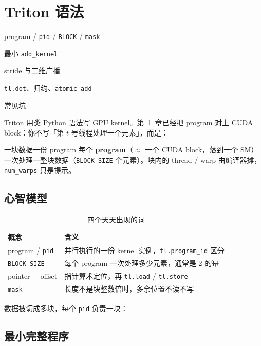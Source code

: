 \chapter{Triton 语法}

\begin{introduction}
  \item program / \texttt{pid} / \texttt{BLOCK} / \texttt{mask}
  \item 最小 \texttt{add\_kernel}
  \item stride 与二维广播
  \item \texttt{tl.dot}、归约、\texttt{atomic\_add}
  \item 常见坑
\end{introduction}

Triton 用类 Python 语法写 GPU kernel。第~1~章已经把 program 对上 CUDA block：你不写「第 $t$ 号线程处理一个元素」，而是：

\begin{proposition}{一块数据一份 program}
每个 \textbf{program}（$\approx$ 一个 CUDA block，落到一个 SM）一次处理一整块数据（\texttt{BLOCK\_SIZE} 个元素）。块内的 thread / warp 由编译器摊，\texttt{num\_warps} 只是提示。
\end{proposition}

\section{心智模型}

\begin{table}[htbp]
  \centering
  \caption{四个天天出现的词}
  \begin{tabular}{ll}
    \toprule
    概念 & 含义 \\
    \midrule
    program / \texttt{pid} & 并行执行的一份 kernel 实例，\texttt{tl.program\_id} 区分 \\
    \texttt{BLOCK\_SIZE} & 每个 program 一次处理多少元素，通常是 2 的幂 \\
    pointer + offset & 指针算术定位，再 \texttt{tl.load} / \texttt{tl.store} \\
    \texttt{mask} & 长度不是块整数倍时，多余位置不读不写 \\
    \bottomrule
  \end{tabular}
\end{table}

数据被切成多块，每个 \texttt{pid} 负责一块：

\figpidone

\section{最小完整程序}

